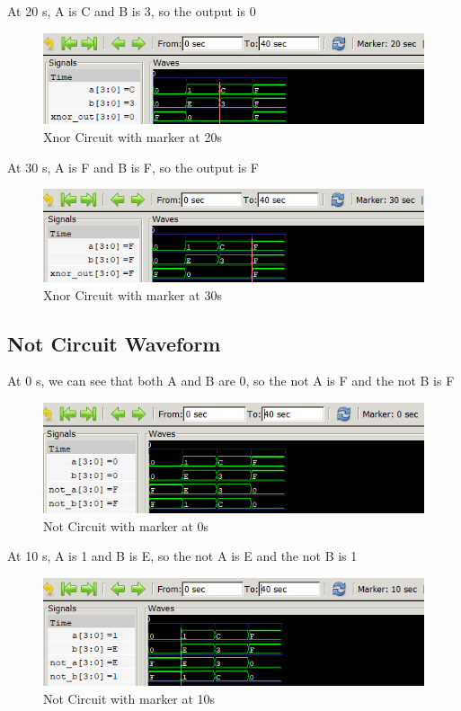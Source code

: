 \documentclass[12pt]{article}
\begin{document}
At 20 s, A is C and B is 3, so the output is 0
\begin{figure}[h]
    \centering
    \includegraphics[width = 1.0\textwidth]{figs/Xnor20.png}
    \caption{Xnor Circuit with marker at 20s}
    \label{fig:enter-label}
\end{figure}

\newpage

At 30 s, A is F and B is F, so the output is F
\begin{figure}[h]
    \centering
    \includegraphics[width = 1.0\textwidth]{figs/Xnor30.png}
    \caption{Xnor Circuit with marker at 30s}
    \label{fig:enter-label}
\end{figure}



\subsection{Not Circuit Waveform}

At 0 s, we can see that both A and B are 0, so the not A is F and the not B is F
\begin{figure}[h]
    \centering
    \includegraphics[width = 1.0\textwidth]{figs/Not0.png}
    \caption{Not Circuit with marker at 0s}
    \label{fig:enter-label}
\end{figure}

\newpage

At 10 s, A is 1 and B is E, so the not A is E and the not B is 1
\begin{figure}[h]
    \centering
    \includegraphics[width = 1.0\textwidth]{figs/Not10.png}
    \caption{Not Circuit with marker at 10s}
    \label{fig:enter-label}
\end{figure}
\end{document}
